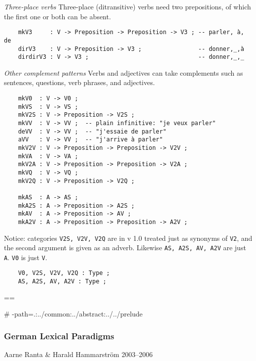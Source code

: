 \documentclass[11pt,a4paper]{article}
\newcommand{\commOut}[1]{}
\newcommand{\subsubsubsection}[1]{\textit{#1}}
\begin{document}
\subsubsubsection{Three-place verbs}
Three-place (ditransitive) verbs need two prepositions, of which
the first one or both can be absent.

\begin{verbatim}
    mkV3     : V -> Preposition -> Preposition -> V3 ; -- parler, à, de
    dirV3    : V -> Preposition -> V3 ;                -- donner,_,à
    dirdirV3 : V -> V3 ;                               -- donner,_,_
\end{verbatim}

\subsubsubsection{Other complement patterns}
Verbs and adjectives can take complements such as sentences,
questions, verb phrases, and adjectives.

\begin{verbatim}
    mkV0  : V -> V0 ;
    mkVS  : V -> VS ;
    mkV2S : V -> Preposition -> V2S ;
    mkVV  : V -> VV ;  -- plain infinitive: "je veux parler"
    deVV  : V -> VV ;  -- "j'essaie de parler"
    aVV   : V -> VV ;  -- "j'arrive à parler"
    mkV2V : V -> Preposition -> Preposition -> V2V ;
    mkVA  : V -> VA ;
    mkV2A : V -> Preposition -> Preposition -> V2A ;
    mkVQ  : V -> VQ ;
    mkV2Q : V -> Preposition -> V2Q ;
  
    mkAS  : A -> AS ;
    mkA2S : A -> Preposition -> A2S ;
    mkAV  : A -> Preposition -> AV ;
    mkA2V : A -> Preposition -> Preposition -> A2V ;
\end{verbatim}

Notice: categories \texttt{V2S, V2V, V2Q} are in v 1.0 treated
just as synonyms of \texttt{V2}, and the second argument is given
as an adverb. Likewise \texttt{AS, A2S, AV, A2V} are just \texttt{A}.
\texttt{V0} is just \texttt{V}.

\begin{verbatim}
    V0, V2S, V2V, V2Q : Type ;
    AS, A2S, AV, A2V : Type ;
\end{verbatim}

\commOut{Produced by 
gfdoc - a rudimentary GF document generator.
(c) Aarne Ranta (\htmladdnormallink{aarne@cs.chalmers.se}{mailto:aarne@cs.chalmers.se}) 2002 under GNU GPL.}

==

\# -path=.:../common:../abstract:../../prelude


\subsubsection{German Lexical Paradigms}
Aarne Ranta \& Harald Hammarström 2003--2006
\end{document}
